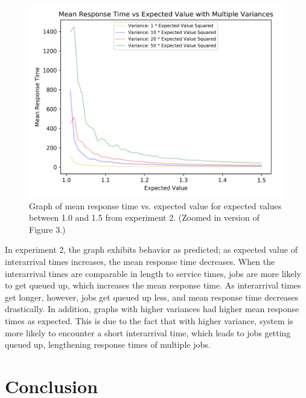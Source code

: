 \documentclass[12pt]{article}
\begin{document}
\begin{figure}[H]
\includegraphics[width=\linewidth]{Analysis2_1_1.png}
\caption{Graph of mean response time vs. expected value for expected values between 1.0 and 1.5 from experiment 2. (Zoomed in version of Figure 3.)}
\end{figure}

In experiment 2, the graph exhibits behavior as predicted; as expected value of interarrival times increases, the mean response time decreases. When the interarrival times are comparable in length to service times, jobs are more likely to get queued up, which increases the mean response time. As interarrival times get longer, however, jobs get queued up less, and mean response time decreases drastically. In addition, graphs with higher variances had higher mean response times as expected. This is due to the fact that with higher variance, system is more likely to encounter a short interarrival time, which leads to jobs getting queued up, lengthening response times of multiple jobs. 

\section{Conclusion}
\end{document}
